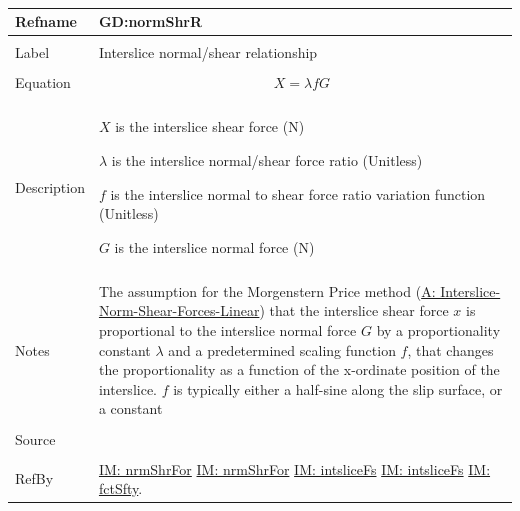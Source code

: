 \documentclass[12pt]{article}
\begin{document}
~\newline
 \noindent \begin{minipage}{\textwidth}
\begin{tabular}{p{} p{}}
\toprule \textbf{Refname} & \textbf{GD:normShrR}
\label{GD:normShrR}
\\ \midrule \\
Label & Interslice normal/shear relationship
        \\ \midrule \\
        Equation & \begin{displaymath}
                   X=λ f G
                   \end{displaymath}
                   \\ \midrule \\
                   Description & \begin{symbDescription}
                                 \item{$X$ is the interslice shear force (N)}
                                 \item{$λ$ is the interslice normal/shear force ratio (Unitless)}
                                 \item{$f$ is the interslice normal to shear force ratio variation function (Unitless)}
                                 \item{$G$ is the interslice normal force (N)}
                                 \end{symbDescription}
                                 \\ \midrule \\
                                 Notes & The assumption for the Morgenstern Price method (\hyperref[assumpINSFL]{A: Interslice-Norm-Shear-Forces-Linear}) that the interslice shear force $x$ is proportional to the interslice normal force $G$ by a proportionality constant $λ$ and a predetermined scaling function $f$, that changes the proportionality as a function of the x-ordinate position of the interslice. $f$ is typically either a half-sine along the slip surface, or a constant
                                         \\ \midrule \\
                                         Source & \cite{chen2005}
                                                  \\ \midrule \\
                                                  RefBy & \hyperref[IM:nrmShrFor]{IM: nrmShrFor} \hyperref[IM:nrmShrFor]{IM: nrmShrFor} \hyperref[IM:intsliceFs]{IM: intsliceFs} \hyperref[IM:intsliceFs]{IM: intsliceFs} \hyperref[IM:fctSfty]{IM: fctSfty}.
\\ \bottomrule \end{tabular}
\end{minipage}\\
\end{document}

